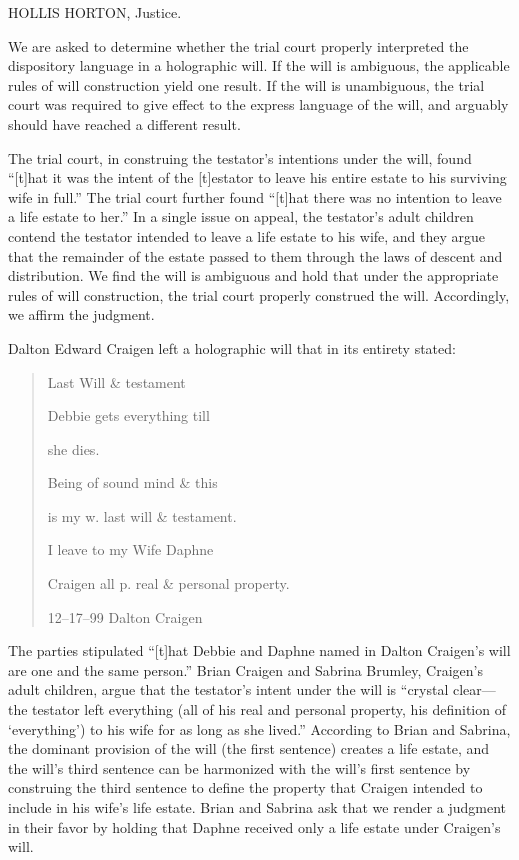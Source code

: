 
HOLLIS HORTON, Justice.

We are asked to determine whether the trial court properly interpreted the
dispository language in a holographic will. If the will is ambiguous, the
applicable rules of will construction yield one result. If the will is
unambiguous, the trial court was required to give effect to the express
language of the will, and arguably should have reached a different result. 

The trial court, in construing the testator's intentions under the will, found
``[t]hat it was the intent of the [t]estator to leave his entire estate to his
surviving wife in full.'' The trial court further found ``[t]hat there was no
intention to leave a life estate to her.'' In a single issue on appeal, the
testator's adult children contend the testator intended to leave a life estate
to his wife, and they argue that the remainder of the estate passed to them
through the laws of descent and distribution. We find the will is ambiguous and
hold that under the appropriate rules of will construction, the trial court
properly construed the will. Accordingly, we affirm the judgment.


Dalton Edward Craigen left a holographic will that in its entirety stated:
\begin{quote}
Last Will \& testament

Debbie gets everything till

she dies.

Being of sound mind \& this

is my w. last will \& testament.

I leave to my Wife Daphne

Craigen all p. real \& personal property.

12--17--99 Dalton Craigen
\end{quote}


The parties stipulated ``[t]hat Debbie and Daphne named in Dalton Craigen's will
are one and the same person.'' Brian Craigen and Sabrina Brumley, Craigen's
adult children, argue that the testator's intent under the will is ``crystal
clear---the testator left everything (all of his real and personal property,
his definition of `everything') to his wife for as long as she lived.''
According to Brian and Sabrina, the dominant provision of the will (the first
sentence) creates a life estate, and the will's third sentence can be
harmonized with the will's first sentence by construing the third sentence to
define the property that Craigen intended to include in his wife's life estate.
Brian and Sabrina ask that we render a judgment in their favor by holding that
Daphne received only a life estate under Craigen's will.

